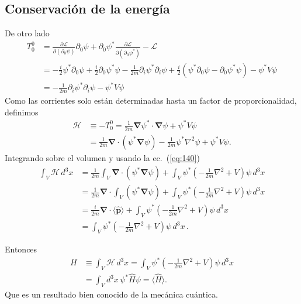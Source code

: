 \subsection{Conservación de la energía}
De otro lado
\begin{align}
  T^0_0&=\frac{\partial\mathcal{L}}{\partial(\partial_0\psi)}{\partial_0\psi}+{\partial_0\psi^*}\frac{\partial\mathcal{L}}{\partial(\partial_0\psi^*)}-\mathcal{L}\nonumber\\
  &=-\frac{i}{2}\psi^*\partial_0\psi+\frac{i}{2}\partial_0\psi^*\psi-\frac{1}{2m}\partial_i\psi^*\partial_i\psi+\frac{i}{2}
  \left(\psi^*\partial_0\psi-\partial_0\psi^*\psi\right)-\psi^*V\psi\nonumber\\
  &=-\frac{1}{2m}\partial_i\psi^*\partial_i\psi-\psi^*V\psi
\end{align}
Como las corrientes solo est\'an determinadas hasta un factor de proporcionalidad, definimos
\begin{align}
  \label{eq:139}
   \mathcal{H}&\equiv-T^0_0=\frac{1}{2m}\boldsymbol{\nabla}\psi^*\cdot\boldsymbol{\nabla}\psi+\psi^*V\psi\nonumber\\
   &=\frac{1}{2m}\boldsymbol{\nabla}\cdot(\psi^*\boldsymbol{\nabla}\psi)-\frac{1}{2m}\psi^*\nabla^2\psi+\psi^*V\psi.
\end{align}
Integrando sobre el volumen y usando la ec.~(\ref{eq:140})
\begin{align}
 \int_V\mathcal{H}\,d^3x&=\frac{1}{2m}\int_V\boldsymbol{\nabla}\cdot(\psi^*\boldsymbol{\nabla}\psi)
+\int_V\psi^*\left(-\frac{1}{2m}\nabla^2+V\right)\psi\,d^3x\nonumber\\
&=\frac{1}{2m}\boldsymbol{\nabla}\cdot\int_V(\psi^*\boldsymbol{\nabla}\psi)
+\int_V\psi^*\left(-\frac{1}{2m}\nabla^2+V\right)\psi\,d^3x\nonumber\\
&=\frac{i}{2m}\boldsymbol{\nabla}\cdot\langle\widehat{\mathbf{p}}\rangle
+\int_V\psi^*\left(-\frac{1}{2m}\nabla^2+V\right)\psi\,d^3x\nonumber\\
&=\int_V\psi^*\left(-\frac{1}{2m}\nabla^2+V\right)\psi\,d^3x\,.
\end{align}

Entonces
\begin{align}
\label{eq:141}
H&\equiv \int_V\mathcal{H}\,d^3x=\int_V\psi^*\left(-\frac{1}{2m}\nabla^2+V\right)\psi\,d^3x\nonumber\\
&=\int_{V} d^3x\,\psi^*\widehat{H}\psi=\langle\widehat{H}\rangle.
\end{align}
Que es un resultado bien conocido de la mec\'anica cu\'antica.

